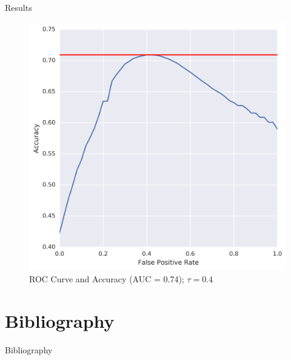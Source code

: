 \documentclass{beamer}
\begin{document}
\begin{frame}[fragile]{Results}
\begin{overlayarea}{\textwidth}{.95\textheight}
{\begin{figure}
				\includegraphics[width=.5\textwidth]{accuracy_marked.png}
				\caption{ROC Curve and Accuracy (AUC = 0.74); $ \tau = 0.4 $}
			\end{figure}
		}{}
	\end{overlayarea}
\end{frame}







\section{Bibliography}

\begin{frame}{Bibliography}

\renewcommand*{\bibfont}{\footnotesize}
\printbibliography{}

\end{frame}
\end{document}
